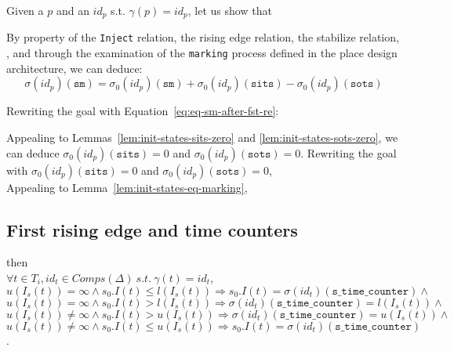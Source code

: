 \documentclass[dvipsnames,12pt]{article}
\begin{document}
\begin{niproof}
  Given a $p$ and an $id_p$ s.t. $\gamma(p)=id_p$, let us show that
  
  \exP{}
    
  By property of the \texttt{Inject} relation, the \hvhdl{} rising
  edge relation, the stabilize relation, \InCsCompP, and through the
  examination of the \texttt{marking} process defined in the place
  design architecture, we can deduce:
  \begin{equation}
    \sigma(id_p)(\texttt{sm})=\sigma_0(id_p)(\texttt{sm})+\sigma_0(id_p)(\texttt{sits})-\sigma_0(id_p)(\texttt{sots})\label{eq:eq-sm-after-fst-re}
  \end{equation}

  Rewriting the goal with Equation~\eqref{eq:eq-sm-after-fst-re}:\\

  Appealing to Lemmas~\ref{lem:init-states-sits-zero} and
  \ref{lem:init-states-sots-zero}, we can deduce
  $\sigma_0(id_p)(\texttt{sits})=0$ and $\sigma_0(id_p)(\texttt{sots})=0$. Rewriting
  the goal with $\sigma_0(id_p)(\texttt{sits})=0$ and
  $\sigma_0(id_p)(\texttt{sots})=0$,
  \\

  Appealing to Lemma~\ref{lem:init-states-eq-marking},
\end{niproof}

\subsection{First rising edge and time counters}
\label{sec:fst-re-tc}

\begin{lemma}
  \label{lem:fst-re-equal-tc}
  \fstrehyps{} then\\
  $\forall{}t\in{}T_i,id_t\in{}Comps(\Delta)~s.t.~\gamma(t)=id_t$,\\
  $u(I_s(t))=\infty\land{}s_0.I(t)\le{}l(I_s(t))\Rightarrow{}s_0.I(t)=\sigma(id_t)(\texttt{s\_time\_counter})\land{}$\\
  $u(I_s(t))=\infty\land{}s_0.I(t)>{}l(I_s(t))\Rightarrow{}\sigma(id_t)(\texttt{s\_time\_counter})=l(I_s(t))\land{}$\\
  $u(I_s(t))\neq\infty\land{}s_0.I(t)>{}u(I_s(t))\Rightarrow{}\sigma(id_t)(\texttt{s\_time\_counter})=u(I_s(t))\land{}$\\
  $u(I_s(t))\neq\infty\land{}s_0.I(t)\le{}u(I_s(t))\Rightarrow{}s_0.I(t)=\sigma(id_t)(\texttt{s\_time\_counter})$.
\end{lemma}
\end{document}
